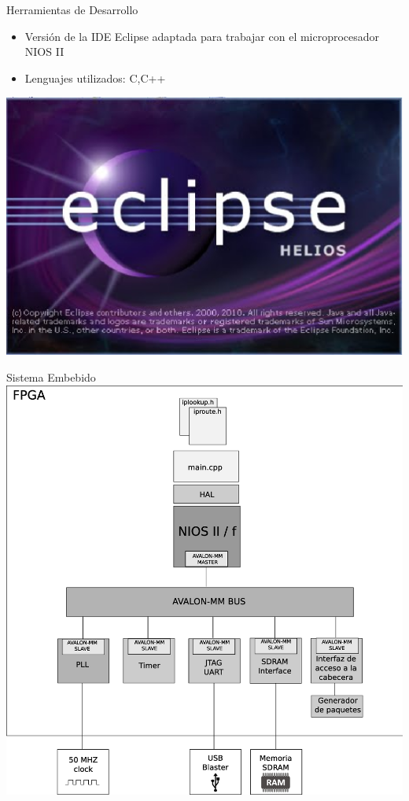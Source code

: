 \documentclass[xcolor=dvipsnames]{beamer}
\begin{document}
\begin{frame}{Herramientas de Desarrollo}
\begin{block}
    \begin{itemize}
      \scriptsize
     	\item Versión de la IDE Eclipse adaptada para trabajar con el microprocesador NIOS II
	\item Lenguajes utilizados: C,C++
    \end{itemize}
	\center	
	\includegraphics[scale=0.10]{figures/eclipse.eps}  	
  \end{block}
\end{frame}

\begin{frame}{Sistema Embebido}
\center
\includegraphics[scale=0.20]{figures/sistema.eps}
   

\end{frame}
\end{document}
